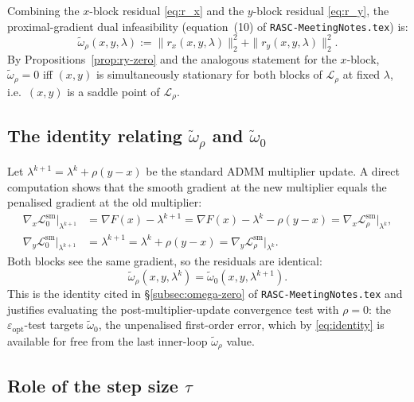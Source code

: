 \documentclass[11pt]{article}
\theoremstyle{plain}
\theoremstyle{remark}
\begin{document}
Combining the $x$-block residual \eqref{eq:r_x} and the $y$-block residual
\eqref{eq:r_y}, the proximal-gradient dual infeasibility (equation~(10) of
\texttt{RASC-MeetingNotes.tex}) is:
\begin{equation}\label{eq:omega-prox}
  \widetilde{\omega}_\rho(x,y,\lambda)
  := \|r_x(x,y,\lambda)\|_2^2 + \|r_y(x,y,\lambda)\|_2^2.
\end{equation}
By Propositions~\ref{prop:ry-zero} and the analogous statement for the
$x$-block, $\widetilde{\omega}_\rho = 0$ iff $(x,y)$ is simultaneously
stationary for both blocks of $\mathcal{L}_\rho$ at fixed $\lambda$, i.e.\
$(x,y)$ is a saddle point of $\mathcal{L}_\rho$.

\subsection{The identity relating $\widetilde{\omega}_\rho$ and $\widetilde{\omega}_0$}

Let $\lambda^{k+1} = \lambda^k + \rho(y - x)$ be the standard ADMM multiplier
update.  A direct computation shows that the smooth gradient at the new
multiplier equals the penalised gradient at the old multiplier:
\begin{align*}
  \nabla_x \mathcal{L}^{\mathrm{sm}}_0\big|_{\lambda^{k+1}}
    &= \nabla F(x) - \lambda^{k+1}
     = \nabla F(x) - \lambda^k - \rho(y-x)
     = \nabla_x \mathcal{L}^{\mathrm{sm}}_\rho\big|_{\lambda^k},\\
  \nabla_y \mathcal{L}^{\mathrm{sm}}_0\big|_{\lambda^{k+1}}
    &= \lambda^{k+1}
     = \lambda^k + \rho(y-x)
     = \nabla_y \mathcal{L}^{\mathrm{sm}}_\rho\big|_{\lambda^k}.
\end{align*}
Both blocks see the same gradient, so the residuals are identical:
\begin{equation}\label{eq:identity}
  \widetilde{\omega}_\rho(x,y,\lambda^k)
  = \widetilde{\omega}_0(x,y,\lambda^{k+1}).
\end{equation}
This is the identity cited in \S\ref{subsec:omega-zero} of
\texttt{RASC-MeetingNotes.tex} and justifies evaluating the post-multiplier-update
convergence test with $\rho = 0$: the $\varepsilon_{\mathrm{opt}}$-test
targets $\widetilde{\omega}_0$, the unpenalised first-order error, which by
\eqref{eq:identity} is available for free from the last inner-loop
$\widetilde{\omega}_\rho$ value.

\subsection{Role of the step size $\tau$}
\end{document}
